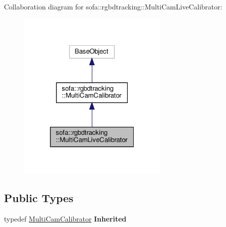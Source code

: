 Collaboration diagram for sofa\+:\+:rgbdtracking\+:\+:Multi\+Cam\+Live\+Calibrator\+:
\nopagebreak
\begin{figure}[H]
\begin{center}
\leavevmode
\includegraphics[width=205pt]{classsofa_1_1rgbdtracking_1_1_multi_cam_live_calibrator__coll__graph}
\end{center}
\end{figure}
\subsection*{Public Types}
\begin{DoxyCompactItemize}
\item 
\mbox{\label{classsofa_1_1rgbdtracking_1_1_multi_cam_live_calibrator_a1f35bfc142bbd24ba42965d2e62cc11c}} 
typedef \hyperlink{classsofa_1_1rgbdtracking_1_1_multi_cam_calibrator}{Multi\+Cam\+Calibrator} {\bfseries Inherited}
\end{DoxyCompactItemize}
